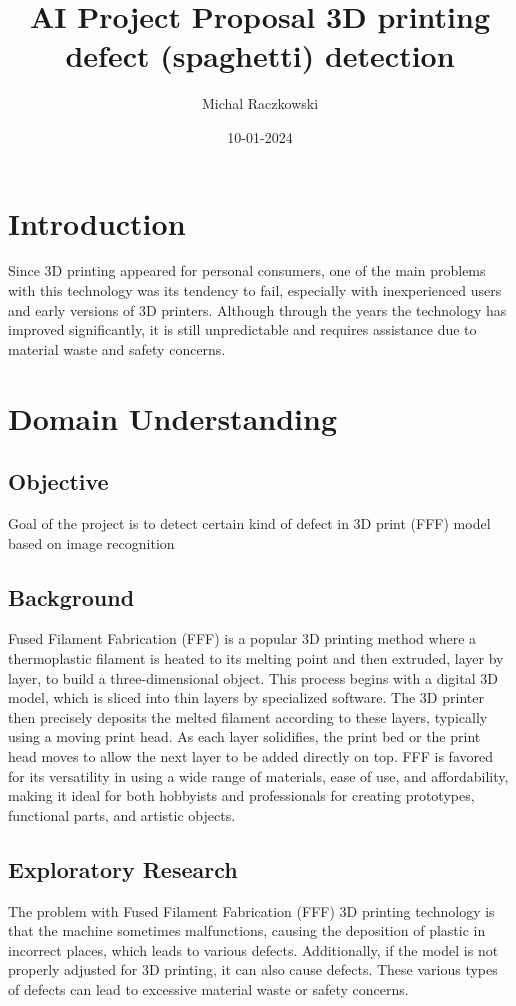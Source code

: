 \documentclass[12pt,a4paper]{article}
\title{\textbf{ AI Project Proposal 3D printing defect (spaghetti) detection}}
\author{Michal Raczkowski}
\date{10-01-2024}
\begin{document}
\maketitle
\thispagestyle{empty} %

\newpage
\tableofcontents
\newpage

\setcounter{page}{1} %

\section{Introduction}
Since 3D printing appeared for personal consumers, one of the main problems with this technology was its tendency to fail, especially with inexperienced users and early versions of 3D printers. Although through the years the technology has improved significantly, it is still unpredictable and requires assistance due to material waste and safety concerns.

\section{Domain Understanding}
\subsection{Objective}
Goal of the project is to detect certain kind of defect in 3D print (FFF) model based on image recognition
\subsection{Background}
Fused Filament Fabrication (FFF) is a popular 3D printing method where a thermoplastic filament is heated to its melting point and then extruded, layer by layer, to build a three-dimensional object. This process begins with a digital 3D model, which is sliced into thin layers by specialized software. The 3D printer then precisely deposits the melted filament according to these layers, typically using a moving print head. As each layer solidifies, the print bed or the print head moves to allow the next layer to be added directly on top. FFF is favored for its versatility in using a wide range of materials, ease of use, and affordability, making it ideal for both hobbyists and professionals for creating prototypes, functional parts, and artistic objects.
\subsection{Exploratory Research}
The problem with Fused Filament Fabrication (FFF) 3D printing technology is that the machine sometimes malfunctions, causing the deposition of plastic in incorrect places, which leads to various defects. Additionally, if the model is not properly adjusted for 3D printing, it can also cause defects. These various types of defects can lead to excessive material waste or safety concerns.
\end{document}
